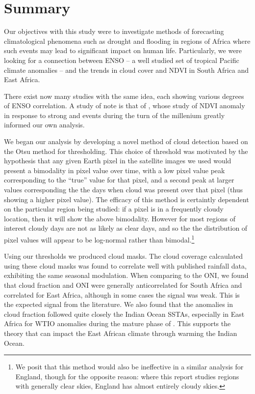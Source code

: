 \section{Summary}

Our objectives with this study were to investigate methods of
forecasting climatological phenomena such as drought and flooding in
regions of Africa where such events may lead to significant impact on
human life. Particularly, we were looking for a connection between
ENSO -- a well studied set of tropical Pacific climate anomalies --
and the trends in cloud cover and NDVI in South Africa and East
Africa.

There exist now many studies with the same idea, each showing various
degrees of ENSO correlation. A study of note is that of
\cite{anyamba2002}, whose study of NDVI anomaly in response to strong
\elnino{} and \nina{} events during the turn of the millenium greatly
informed our own analysis.

We began our analysis by developing a novel method of cloud detection
based on the Otsu method for thresholding. This choice of threshold
was motivated by the hypothesis that any given Earth pixel in the
satellite images we used would present a bimodality in pixel value
over time, with a low pixel value peak corresponding to the ``true''
value for that pixel, and a second peak at larger values corresponding
the the days when cloud was present over that pixel (thus showing a
higher pixel value). The efficacy of this method is certaintly
dependent on the particular region being studied: if a pixel is in a
frequently cloudy location, then it will show the above
bimodality. However for most regions of interest cloudy days are not
as likely as clear days, and so the the distribution of pixel values
will appear to be log-normal rather than bimodal.\footnote{We posit
  that this method would also be ineffective in a similar analysis for
  England, though for the opposite reason: where this report studies
  regions with generally clear skies, England has almost entirely
  cloudy skies.}

Using our thresholds we produced cloud masks. The cloud coverage
calcaulated using these cloud masks was found to correlate well with
published rainfall data, exhibiting the same seasonal modulation. When
comparing to the ONI, we found that cloud fraction and ONI were
generally anticorrelated for South Africa and correlated for East
Africa, although in some cases the signal was weak. This is the
expected signal from the literature. We also found that the anomalies
in cloud fraction followed quite closely the Indian Ocean SSTAs,
especially in East Africa for WTIO anomalies during the mature phase
of \elnino{}. This supports the theory that \elnino{} can impact the
East African climate through warming the Indian Ocean.

